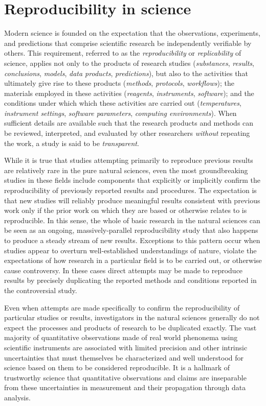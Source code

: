 \section{Reproducibility in science}

Modern science is founded on the expectation that the observations, experiments, and
	predictions that comprise scientific research be independently verifiable by others.
This requirement, referred to as the \emph{reproducibility} or \emph{replicability} of 
	science, applies not only to the products of research studies (\emph{substances}, 
	\emph{results}, \emph{conclusions}, \emph{models}, \emph{data products}, 
	\emph{predictions}), but also to the activities that ultimately give rise to these
	products (\emph{methods}, \emph{protocols}, \emph{workflows}); the materials 
	employed in these activities (\emph{reagents}, \emph{instruments}, 
	\emph{software}); and the conditions 
	under which which these activities are carried out (\emph{temperatures},
	\emph{instrument settings}, \emph{software parameters},
	\emph{computing environments}).  When sufficient details are available
	such that the research products and methods can be reviewed, interpreted, and
	evaluated by other researchers \emph{without} repeating the work, a study is said to be 
	\emph{transparent}.

While it is true that studies attempting primarily to reproduce previous results are relatively rare in the
	pure natural sciences, even the most groundbreaking studies in these fields include components	
	that explicitly or implicitly confirm the reproducibility of previously reported results and procedures.
The expectation is that new studies will reliably produce meaningful results consistent with previous work 
	only if the prior work on which they are based or otherwise relates to is reproducible.
In this sense, the whole of basic research in the natural sciences can be seen as an ongoing, massively-parallel
	reproducibility study that also happens to produce a steady stream of new results.
Exceptions to this pattern occur when studies appear to overturn well-established understandings of nature,
	violate the expectations of how research in a particular field is to be carried out, or otherwise cause controversy.
In these cases direct attempts may be made to reproduce results by precisely duplicating the reported methods
	and conditions reported in the controversial study.

Even when attempts are made specifically to confirm the reproducibility of particular studies or results, investigators in
	the natural sciences generally do not expect the processes and products of research to be duplicated exactly.
The vast majority of quantitative observations made of real world phenonema using scientific instruments
	are associated with limited precision and other intrinsic uncertainties that must themselves be characterized
	and well understood for science based on them to be considered reproducible.
It is a hallmark of trustworthy science that quantitative observations and claims are inseparable from these 
	uncertainties in measurement and their propagation through data analysis.

